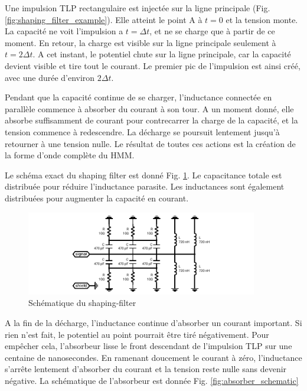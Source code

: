 Une impulsion TLP rectangulaire est injectée sur la ligne principale (Fig. \ref{fig:shaping_filter_example}).
Elle atteint le point A à $t=0$ et la tension monte.
La capacité ne voit l'impulsion a $t=\Delta t$, et ne se charge que à partir de ce moment.
En retour, la charge est visible sur la ligne principale seulement à $t=2\Delta t$.
A cet instant, le potentiel chute sur la ligne principale, car la capacité devient visible et tire tout le courant.
Le premier pic de l'impulsion est ainsi créé, avec une durée d'environ $2\Delta t$.

Pendant que la capacité continue de se charger, l'inductance connectée en parallèle commence à absorber du courant à son tour.
A un moment donné, elle absorbe suffisamment de courant pour contrecarrer la charge de la capacité, et la tension commence à redescendre.
La décharge se poursuit lentement jusqu'à retourner à une tension nulle.
Le résultat de toutes ces actions est la création de la forme d'onde complète du HMM.

Le schéma exact du shaping filter est donné Fig. \ref{fig:shaping_filter_schematic}.
Le capacitance totale est distribuée pour réduire l'inductance parasite.
Les inductances sont également distribuées pour augmenter la capacité en courant.

\begin{figure}[!h]
  \centering
  \includegraphics[width=0.9\textwidth]{src/1/figures/shaping_filter_schematic.pdf}
  \caption{Schématique du shaping-filter}
  \label{fig:shaping_filter_schematic}
\end{figure}

A la fin de la décharge, l'inductance continue d'absorber un courant important.
Si rien n'est fait, le potentiel au point pourrait être tiré négativement.
Pour empêcher cela, l'absorbeur lisse le front descendant de l'impulsion TLP sur une centaine de nanosecondes.
En ramenant doucement le courant à zéro, l'inductance s'arrête lentement d'absorber du courant et la tension reste nulle sans devenir négative.
La schématique de l'absorbeur est donnée Fig. \ref{fig:absorber_schematic}

